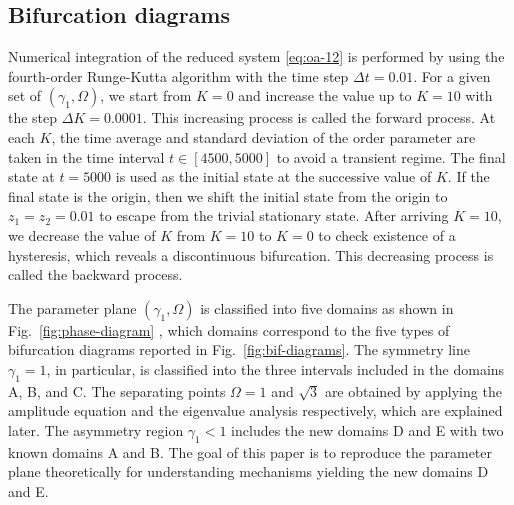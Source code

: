 \subsection{Bifurcation diagrams}


Numerical integration of the reduced system \eqref{eq:oa-12}
is performed by using the fourth-order Runge-Kutta algorithm
with the time step $\Delta t=0.01$.
For a given set of $(\gamma_{1},\Omega)$,
we start from $K=0$ and increase the value up to $K=10$
with the step $\Delta K=0.0001$.
This increasing process is called the forward process.
At each $K$, the time average and standard deviation of the order parameter
are taken in the time interval $t\in [4500,5000]$ to avoid a transient regime.
The final state at $t=5000$ is used
as the initial state at the successive value of $K$.
If the final state is the origin,
then we shift the initial state from the origin to $z_{1}=z_{2}=0.01$
to escape from the trivial stationary state.
After arriving $K=10$, we decrease the value of $K$
from $K=10$ to $K=0$ to check existence of a hysteresis,
which reveals a discontinuous bifurcation.
This decreasing process is called the backward process.

The parameter plane $(\gamma_{1},\Omega)$ is classified
into five domains as shown in Fig.~\ref{fig:phase-diagram}
\cite{terada2018},
which domains correspond to the five types of bifurcation diagrams
reported in Fig.~\ref{fig:bif-diagrams}.
The symmetry line $\gamma_{1}=1$,
in particular,
is classified into the three intervals included in the domains A, B, and C.
The separating points $\Omega=1$ and $\sqrt{3}$
are obtained by applying the amplitude equation
and the eigenvalue analysis respectively, which are explained later. 
The asymmetry region $\gamma_{1}<1$
includes the new domains D and E
with two known domains A and B.
The goal of this paper is to reproduce
the parameter plane theoretically
for understanding mechanisms yielding the new domains D and E.
  



